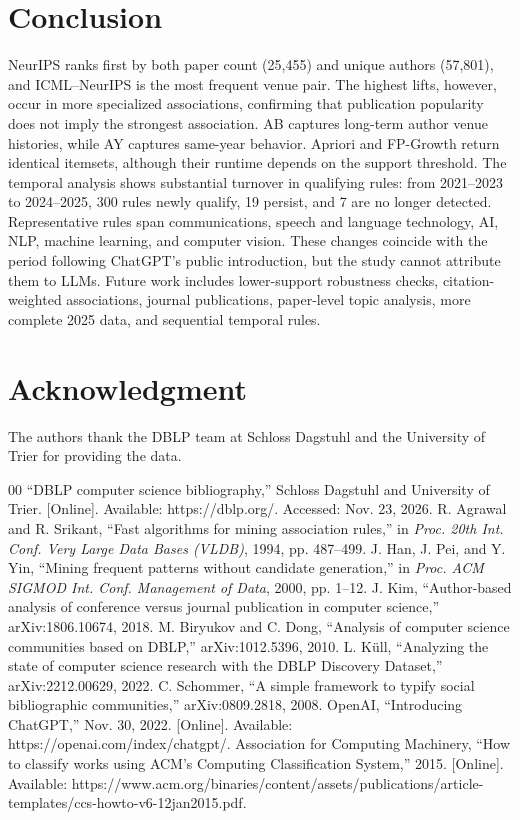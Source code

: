 ﻿\documentclass[conference]{IEEEtran}
\begin{document}
\section{Conclusion}
NeurIPS ranks first by both paper count (25,455) and unique authors (57,801), and ICML--NeurIPS is the most frequent venue pair. The highest lifts, however, occur in more specialized associations, confirming that publication popularity does not imply the strongest association. AB captures long-term author venue histories, while AY captures same-year behavior. Apriori and FP-Growth return identical itemsets, although their runtime depends on the support threshold. The temporal analysis shows substantial turnover in qualifying rules: from 2021--2023 to 2024--2025, 300 rules newly qualify, 19 persist, and 7 are no longer detected. Representative rules span communications, speech and language technology, AI, NLP, machine learning, and computer vision. These changes coincide with the period following ChatGPT's public introduction, but the study cannot attribute them to LLMs. Future work includes lower-support robustness checks, citation-weighted associations, journal publications, paper-level topic analysis, more complete 2025 data, and sequential temporal rules.

\section*{Acknowledgment}
The authors thank the DBLP team at Schloss Dagstuhl and the University of Trier for providing the data.

\begin{thebibliography}{00}
 ``DBLP computer science bibliography,'' Schloss Dagstuhl and University of Trier. [Online]. Available: https://dblp.org/. Accessed: Nov. 23, 2026.
 R. Agrawal and R. Srikant, ``Fast algorithms for mining association rules,'' in \textit{Proc. 20th Int. Conf. Very Large Data Bases (VLDB)}, 1994, pp. 487--499.
 J. Han, J. Pei, and Y. Yin, ``Mining frequent patterns without candidate generation,'' in \textit{Proc. ACM SIGMOD Int. Conf. Management of Data}, 2000, pp. 1--12.
 J. Kim, ``Author-based analysis of conference versus journal publication in computer science,'' arXiv:1806.10674, 2018.
 M. Biryukov and C. Dong, ``Analysis of computer science communities based on DBLP,'' arXiv:1012.5396, 2010.
 L. K\"ull, ``Analyzing the state of computer science research with the DBLP Discovery Dataset,'' arXiv:2212.00629, 2022.
 C. Schommer, ``A simple framework to typify social bibliographic communities,'' arXiv:0809.2818, 2008.
 OpenAI, ``Introducing ChatGPT,'' Nov. 30, 2022. [Online]. Available: https://openai.com/index/chatgpt/.
 Association for Computing Machinery, ``How to classify works using ACM's Computing Classification System,'' 2015. [Online]. Available: https://www.acm.org/binaries/content/assets/publications/article-templates/ccs-howto-v6-12jan2015.pdf.
\end{thebibliography}
\end{document}
